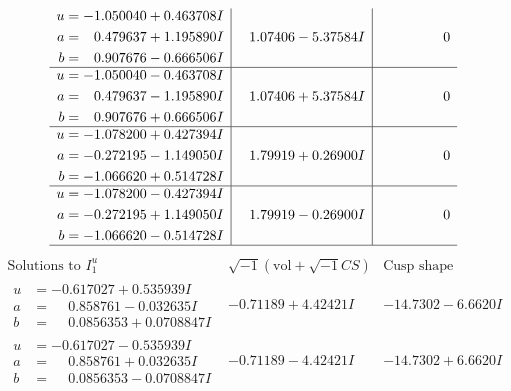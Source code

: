 \documentclass[1p]{elsarticle_modified}
\theoremstyle{definition}
\newcommand{\I}{\sqrt{-1}}
\begin{document}
$$\begin{array}{c|c|c}
\begin{aligned}
u &= -1.050040 + 0.463708 I \\
a &= \phantom{-}0.479637 + 1.195890 I \\
b &= \phantom{-}0.907676 - 0.666506 I\end{aligned}
 & \phantom{-}1.07406 - 5.37584 I & \phantom{-0.000000 } 0 \\ \hline\begin{aligned}
u &= -1.050040 - 0.463708 I \\
a &= \phantom{-}0.479637 - 1.195890 I \\
b &= \phantom{-}0.907676 + 0.666506 I\end{aligned}
 & \phantom{-}1.07406 + 5.37584 I & \phantom{-0.000000 } 0 \\ \hline\begin{aligned}
u &= -1.078200 + 0.427394 I \\
a &= -0.272195 - 1.149050 I \\
b &= -1.066620 + 0.514728 I\end{aligned}
 & \phantom{-}1.79919 + 0.26900 I & \phantom{-0.000000 } 0 \\ \hline\begin{aligned}
u &= -1.078200 - 0.427394 I \\
a &= -0.272195 + 1.149050 I \\
b &= -1.066620 - 0.514728 I\end{aligned}
 & \phantom{-}1.79919 - 0.26900 I & \phantom{-0.000000 } 0\\
 \hline 
 \end{array}$$\newpage$$\begin{array}{c|c|c}  
\text{Solutions to }I^u_{1}& \I (\text{vol} + \sqrt{-1}CS) & \text{Cusp shape}\\
 \hline 
\begin{aligned}
u &= -0.617027 + 0.535939 I \\
a &= \phantom{-}0.858761 - 0.032635 I \\
b &= \phantom{-}0.0856353 + 0.0708847 I\end{aligned}
 & -0.71189 + 4.42421 I & -14.7302 - 6.6620 I \\ \hline\begin{aligned}
u &= -0.617027 - 0.535939 I \\
a &= \phantom{-}0.858761 + 0.032635 I \\
b &= \phantom{-}0.0856353 - 0.0708847 I\end{aligned}
 & -0.71189 - 4.42421 I & -14.7302 + 6.6620 I \\ \hline\begin{aligned}

\end{aligned}
\end{array}$$
\end{document}
